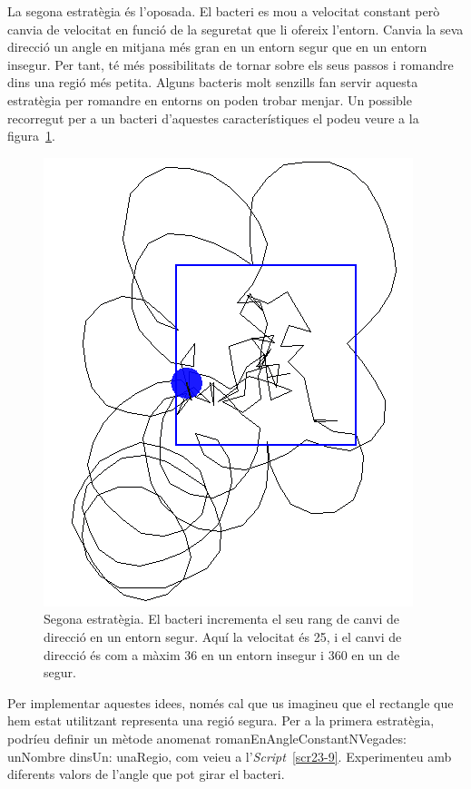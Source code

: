 La segona estratègia és l'oposada. El bacteri es mou a velocitat constant però canvia de velocitat en funció de la seguretat que li ofereix l'entorn. Canvia la seva direcció un angle en mitjana més gran en un entorn segur que en un entorn insegur. Per tant, té més possibilitats de tornar sobre els seus passos i romandre dins una regió més petita. Alguns bacteris molt senzills fan servir aquesta estratègia per romandre en entorns on poden trobar menjar. Un possible recorregut per a un bacteri d'aquestes característiques el podeu veure a la figura~\ref{fig2309}.
\begin{figure}[h!]
\begin{center}
\includegraphics[scale=0.5]{Imatges/figura23-9}
\end{center}
\caption{Segona estratègia. El bacteri incrementa el seu rang de canvi de direcció en un entorn segur. Aquí la velocitat és 25, i el canvi de direcció és com a màxim 36 en un entorn insegur i 360 en un de segur.}
\label{fig2309}
\end{figure}

Per implementar aquestes idees, només cal que us imagineu que el rectangle que hem estat utilitzant representa una regió segura. Per a la primera estratègia, podríeu definir un mètode anomenat \textsf{romanEnAngleConstantNVegades: unNombre dinsUn: unaRegio}, com veieu a l'\emph{Script}~\ref{scr23-9}. Experimenteu amb diferents valors de l'angle que pot girar el bacteri. 

